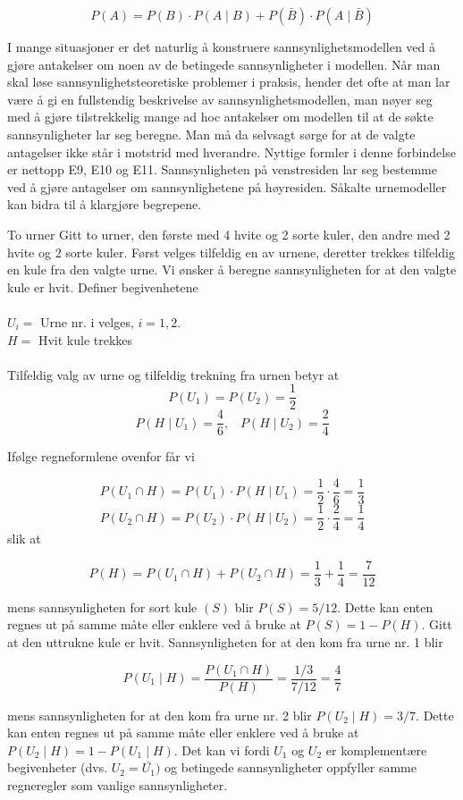 \[  P(A)=P(B)\cdot P(A\mid B)+P(\bar{B})\cdot P(A\mid \bar{B}) \]

I mange situasjoner er det naturlig å konstruere
sannsynlighetsmodellen ved å gjøre antakelser om noen av de
betingede sannsynligheter i modellen. Når man skal løse
sannsynlighetsteoretiske problemer i praksis, hender det ofte at
man lar være å gi en fullstendig beskrivelse av
sannsynlighets\-mo\-dellen, man nøyer seg med å gjøre tilstrekkelig
mange ad hoc antakelser om modellen til at de søkte
sannsynligheter lar seg beregne. Man må da selvsagt sørge for at
de valgte antagelser ikke står i motstrid med hverandre. Nyttige
formler i denne forbindelse er nettopp E9, E10 og E11.
Sannsynligheten på venstresiden lar seg bestemme ved å gjøre
antagelser om sannsynlighetene på høyresiden.
Såkalte urnemodeller kan bidra til å klargjøre begrepene. \\

\begin{eksempel}{To urner}
Gitt to urner, den første med 4 hvite og 2 sorte kuler, den andre
med 2 hvite og 2 sorte kuler. Først velges tilfeldig en av
urnene, deretter trekkes tilfeldig en kule fra den valgte urne.
Vi ønsker å beregne sannsynligheten for at den valgte kule er
hvit. Definer begivenhetene \\ \\
\indent            $U_i=$ Urne nr. i velges, $i=1,2.$ \\
\indent            $H  =$ Hvit kule trekkes \\ \\
\noindent Tilfeldig valg av urne og tilfeldig trekning fra urnen betyr at
\[ P(U_1)=P(U_2)=\frac{1}{2} \]
\[ P(H \mid U_1)=\frac{4}{6},\;\;\;  P(H \mid U_2)=\frac{2}{4} \]

\noindent Ifølge regneformlene ovenfor får vi

\[ P(U_1 \cap H)=P(U_1) \cdot P(H \mid U_1)=
                   \frac{1}{2} \cdot \frac{4}{6}=\frac{1}{3} \]
\[ P(U_2 \cap H)=P(U_2) \cdot P(H \mid U_2)=
                   \frac{1}{2} \cdot \frac{2}{4}=\frac{1}{4} \]
slik at

\[ P(H)=P(U_1 \cap H)+P(U_2 \cap H)= \frac{1}{3} + \frac{1}{4}=\frac{7}{12}\]

\noindent mens sannsynligheten for sort kule $(S)$ blir $P(S)=5/12$. Dette
kan enten regnes ut på samme måte eller enklere ved å bruke at
$P(S)=1-P(H)$. Gitt at den uttrukne kule er hvit. Sannsynligheten
for at den kom fra urne nr. 1 blir

\[    P(U_1 \mid H)=\frac{P(U_1 \cap H)}{P(H)}=\frac{1/3}{7/12}=\frac{4}{7}\]

\noindent mens sannsynligheten for at den kom fra urne nr. 2 blir
$P(U_2\mid H)=3/7$. Dette kan enten regnes ut på samme måte eller
enklere ved å bruke at $P(U_2\mid H)=1-P(U_1\mid H)$. Det kan vi
fordi $U_1$ og $U_2$ er komplementære begivenheter (dvs. $U_2=\bar{U_1})$ og
 betingede sannsynligheter oppfyller samme
regneregler som vanlige sannsynligheter.
\end{eksempel}

